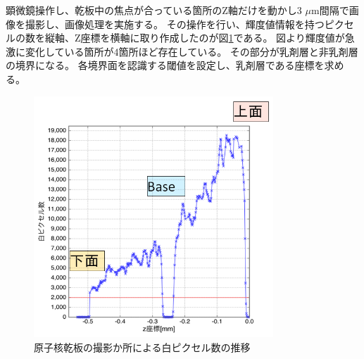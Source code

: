 \documentclass[12pt,a4paper]{jarticle}
\begin{document}
\newpage
\par
顕微鏡操作し、乾板中の焦点が合っている箇所のZ軸だけを動かし3 $\mu$m間隔で画像を撮影し、画像処理を実施する。
その操作を行い、輝度値情報を持つピクセルの数を縦軸、Z座標を横軸に取り作成したのが図\ref{fig:hyoumenn_kidoti}である。
図より輝度値が急激に変化している箇所が4箇所ほど存在している。
その部分が乳剤層と非乳剤層の境界になる。
各境界面を認識する閾値を設定し、乳剤層である座標を求める。
\begin{figure}[htbp]
  \centering
     \includegraphics[width=90mm]{hyoumenn.png}
  \caption{原子核乾板の撮影か所による白ピクセル数の推移\label{fig:hyoumenn_kidoti}}
\end{figure}
\newpage
\end{document}

